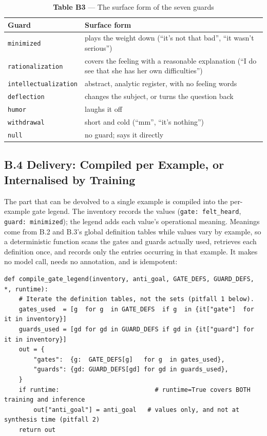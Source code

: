 \documentclass[letterpaper]{article}
\begin{document}
\begin{table}[t]
\centering\footnotesize
\setlength{\tabcolsep}{4pt}
\caption{\textbf{Table B3} --- The surface form of the seven guards}
\begin{tabular}{@{}>{\raggedright\arraybackslash}p{}>{\raggedright\arraybackslash}p{}@{}}
\toprule
Guard & Surface form \\
\midrule
\texttt{minimized} & plays the weight down (``it's not that bad'', ``it wasn't serious'') \\
\texttt{rationalization} & covers the feeling with a reasonable explanation (``I do see that she has her own difficulties'') \\
\texttt{intellectualization} & abstract, analytic register, with no feeling words \\
\texttt{deflection} & changes the subject, or turns the question back \\
\texttt{humor} & laughs it off \\
\texttt{withdrawal} & short and cold (``mm'', ``it's nothing'') \\
\texttt{null} & no guard; says it directly \\
\bottomrule
\end{tabular}
\end{table}


\subsection*{B.4 Delivery: Compiled per Example, or Internalised by Training}

The part that can be devolved to a single example is compiled into the per-example gate legend. The inventory records the values (\texttt{gate: felt\_heard}, \texttt{guard: minimized}); the legend adds each value's operational meaning. Meanings come from B.2 and B.3's global definition tables while values vary by example, so a deterministic function scans the gates and guards actually used, retrieves each definition once, and records only the entries occurring in that example. It makes no model call, needs no annotation, and is idempotent:

\begin{Verbatim}[fontsize=\footnotesize,frame=single,rulecolor=\color{codeframe},breaklines=true,breakanywhere=true,breaksymbolleft={\tiny\ensuremath{\hookrightarrow}}]
def compile_gate_legend(inventory, anti_goal, GATE_DEFS, GUARD_DEFS, *, runtime):
    # Iterate the definition tables, not the sets (pitfall 1 below).
    gates_used  = [g  for g  in GATE_DEFS  if g  in {it["gate"]  for it in inventory}]
    guards_used = [gd for gd in GUARD_DEFS if gd in {it["guard"] for it in inventory}]
    out = {
        "gates":  {g:  GATE_DEFS[g]   for g  in gates_used},
        "guards": {gd: GUARD_DEFS[gd] for gd in guards_used},
    }
    if runtime:                          # runtime=True covers BOTH training and inference
        out["anti_goal"] = anti_goal   # values only, and not at synthesis time (pitfall 2)
    return out
\end{Verbatim}
\end{document}
